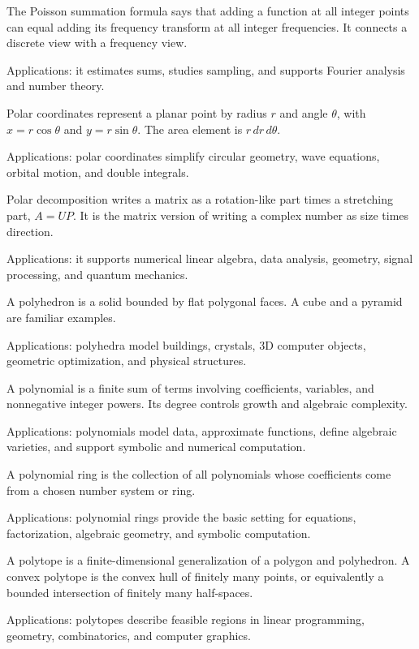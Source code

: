 The Poisson summation formula says that adding a function at all integer points can equal adding its frequency transform at all integer frequencies. It connects a discrete view with a frequency view. \par\noindent Applications: it estimates sums, studies sampling, and supports Fourier analysis and number theory.

Polar coordinates represent a planar point by radius $r$ and angle $\theta$, with $x=r\cos\theta$ and $y=r\sin\theta$. The area element is $r\,dr\,d\theta$. \par\noindent Applications: polar coordinates simplify circular geometry, wave equations, orbital motion, and double integrals.

Polar decomposition writes a matrix as a rotation-like part times a stretching part, $A=UP$. It is the matrix version of writing a complex number as size times direction. \par\noindent Applications: it supports numerical linear algebra, data analysis, geometry, signal processing, and quantum mechanics.

A polyhedron is a solid bounded by flat polygonal faces. A cube and a pyramid are familiar examples. \par\noindent Applications: polyhedra model buildings, crystals, 3D computer objects, geometric optimization, and physical structures.

A polynomial is a finite sum of terms involving coefficients, variables, and nonnegative integer powers. Its degree controls growth and algebraic complexity. \par\noindent Applications: polynomials model data, approximate functions, define algebraic varieties, and support symbolic and numerical computation.

A polynomial ring is the collection of all polynomials whose coefficients come from a chosen number system or ring. \par\noindent Applications: polynomial rings provide the basic setting for equations, factorization, algebraic geometry, and symbolic computation.

A polytope is a finite-dimensional generalization of a polygon and polyhedron. A convex polytope is the convex hull of finitely many points, or equivalently a bounded intersection of finitely many half-spaces. \par\noindent Applications: polytopes describe feasible regions in linear programming, geometry, combinatorics, and computer graphics.

